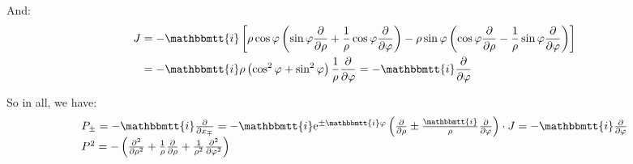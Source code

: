 \documentclass[]{ctexart}
\newcommand{\mi}{\mathbbmtt{i}}
\newcommand{\me}{\mathrm{e}}
\begin{document}
	And:
		\begin{equation*}
		\begin{aligned}
			J &=-\mi\left[\rho \cos \varphi\left(\sin \varphi \frac{\partial}{\partial \rho}+\frac{1}{\rho} \cos \varphi \frac{\partial}{\partial \varphi}\right)-\rho \sin \varphi\left(\cos \varphi \frac{\partial}{\partial \rho}-\frac{1}{\rho} \sin \varphi \frac{\partial}{\partial \varphi}\right)\right] \\
			&=-\mi \rho \left(\cos ^{2} \varphi+\sin ^{2} \varphi\right) \frac{1}{\rho} \frac{\partial}{\partial \varphi}=-\mi \frac{\partial}{\partial \varphi}
		\end{aligned}
		\end{equation*}
	
	So in all, we have:
		\begin{equation*}
		\begin{aligned}
			\begin{array}{l}
			P_{\pm}=-\mi \frac{\partial}{\partial x_{\mp}}=-\mi \me^{\pm \mi \varphi}\left(\frac{\partial}{\partial \rho} \pm \frac{\mi}{\rho} \frac{\partial}{\partial \varphi}\right) \cdot J=-\mi \frac{\partial}{\partial \varphi} \\
			P^{2} =-\left(\frac{\partial^{2}}{\partial \rho^{2}}+\frac{1}{\rho} \frac{\partial}{\partial \rho}+\frac{1}{\rho^{2}} \frac{\partial^{2}}{\partial \varphi^{2}}\right)
			\end{array}
		\end{aligned}
		\end{equation*}
		
\end{document}
